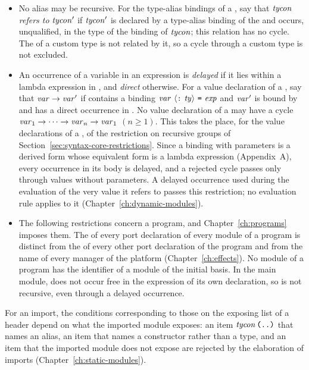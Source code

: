 \begin{itemize}
\item{} No alias may be recursive. For the type-alias bindings of a \topdec,
  say that $\mathit{tycon}$ \emph{refers to} $\mathit{tycon}'$ if $\mathit{tycon}'$ is declared by a
  type-alias binding of the \topdec{} and occurs, unqualified, in the type of
  the binding of $\mathit{tycon}$; this relation has no cycle. The \tycon{} of a
  custom type is not related by it, so a cycle through a custom type is not
  excluded.

\item{} An occurrence of a variable in an expression \expm{} is
  \emph{delayed} if it lies within a lambda expression in \expm, and
  \emph{direct} otherwise. For a value declaration \valbind{} of a \topdec,
  say that $\mathit{var} \to \mathit{var}'$ if \valbind{} contains a binding $\mathit{var}\
  \langle \textnormal{\texttt{:}}\ \mathit{ty}\rangle\ \textnormal{\texttt{=}}\ \mathit{exp}$ and $\mathit{var}'$ is bound by \valbind{} and
  has a direct occurrence in \expm. No value declaration of a \topdec{} may
  have a cycle $\mathit{var}_1 \to \cdots \to \mathit{var}_n \to \mathit{var}_1$ $(n \geq 1)$. This
  takes the place, for the value declarations of a \topdec, of the
  restriction on recursive groups of
  Section~\ref{sec:syntax-core-restrictions}. Since a binding with
  parameters is a derived form whose equivalent form is a lambda expression
  (Appendix~A), every occurrence in its body is delayed, and a rejected cycle
  passes only through values without parameters. A delayed occurrence used
  during the evaluation of the very value it refers to passes this
  restriction; no evaluation rule applies to it
  (Chapter~\ref{ch:dynamic-modules}).

\item{} The following restrictions concern a program, and
  Chapter~\ref{ch:programs} imposes them. The \var{} of every port
  declaration of every module of a program is distinct from the \var{} of
  every other port declaration of the program and from the name of every
  manager of the platform (Chapter~\ref{ch:effects}). No module of a program
  has the identifier of a module of the initial basis. In the main module,
   does not occur free in the expression of its own declaration, so
  \kw{main} is not recursive, even through a delayed occurrence.
\end{itemize}

For an import, the conditions corresponding to those on the exposing list of
a header depend on what the imported module exposes: an item
$\mathit{tycon}\,\textnormal{\texttt{(..)}}$ that names an alias, an item \tycon{} that names a
constructor rather than a type, and an item that the imported module does not
expose are rejected by the elaboration of imports
(Chapter~\ref{ch:static-modules}).
